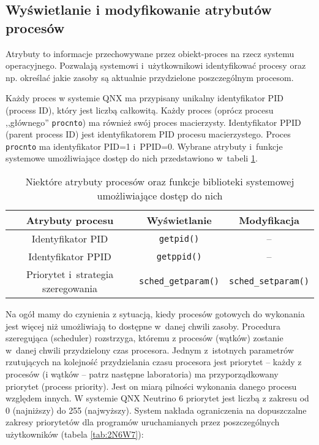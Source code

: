 \subsection{Wyświetlanie i modyfikowanie atrybutów procesów}

Atrybuty to informacje przechowywane przez obiekt-proces na rzecz systemu
operacyjnego. Pozwalają systemowi i~użytkownikowi identyfikować procesy oraz
np. określać jakie zasoby są aktualnie przydzielone poszczególnym procesom.

Każdy proces w systemie QNX ma przypisany unikalny identyfikator PID (process
ID), który jest liczbą całkowitą. Każdy proces (oprócz procesu ,,głównego''
\texttt{procnto}) ma również swój proces macierzysty. Identyfikator PPID
(parent process ID) jest identyfikatorem PID procesu macierzystego. Proces
\texttt{procnto} ma identyfikator PID=1 i~PPID=0. Wybrane
atrybuty i~funkcje systemowe umożliwiające dostęp do nich przedstawiono
w~tabeli \ref{tab:HE6LE}.

\begin{table}[h!]
  \centering
  \caption{Niektóre atrybuty procesów oraz funkcje biblioteki systemowej
           umożliwiające dostęp do nich}
  \label{tab:HE6LE}
  \begin{tabular}{|c|c|c|}
    \hline
    \textbf{Atrybuty procesu} & \textbf{Wyświetlanie} & \textbf{Modyfikacja} \\ \hline
    Identyfikator PID                   & \texttt{getpid()}           & -- \\ \hline
    Identyfikator PPID                  & \texttt{getppid()}          & -- \\ \hline
    Priorytet i~strategia szeregowania  & \texttt{sched\_getparam()}  & \texttt{sched\_setparam()} \\ \hline
  \end{tabular}
\end{table}

Na ogół mamy do czynienia z sytuacją, kiedy procesów gotowych do wykonania jest
więcej niż umożliwiają to dostępne w~danej chwili zasoby. Procedura szeregująca
(scheduler) rozstrzyga, któremu z procesów (wątków) zostanie w~danej chwili
przydzielony czas procesora. Jednym z~istotnych parametrów rzutujących na
kolejność przydzielania czasu procesora jest priorytet -- każdy z procesów (i
wątków -- patrz następne laboratoria) ma przyporządkowany priorytet (process
priority).  Jest on miarą pilności wykonania danego procesu względem innych.
W systemie QNX Neutrino 6 priorytet jest liczbą z zakresu od 0 (najniższy) do
255 (najwyższy). System nakłada ograniczenia na dopuszczalne zakresy
priorytetów dla programów uruchamianych przez poszczególnych użytkowników
(tabela \ref{tab:2N6W7}):

